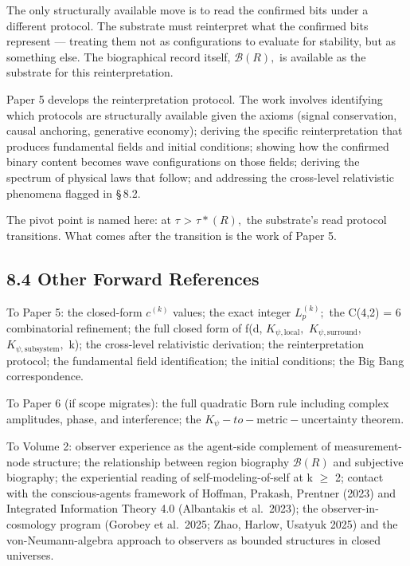 \documentclass[11pt,oneside]{report}
\theoremstyle{definition}
\theoremstyle{remark}
\begin{document}
The only structurally available move is to read the confirmed bits under
a different protocol. The substrate must reinterpret what the confirmed
bits represent --- treating them not as configurations to evaluate for
stability, but as something else. The biographical record itself, \ensuremath{\mathcal{B}(R),}
is available as the substrate for this reinterpretation.

Paper 5 develops the reinterpretation protocol. The work involves
identifying which protocols are structurally available given the axioms
(signal conservation, causal anchoring, generative economy); deriving
the specific reinterpretation that produces fundamental fields and
initial conditions; showing how the confirmed binary content becomes
wave configurations on those fields; deriving the spectrum of physical
laws that follow; and addressing the cross-level relativistic phenomena
flagged in \S\,8.2.

The pivot point is named here: at \ensuremath{\tau} \textgreater{} \ensuremath{\tau *(R),} the
substrate's read protocol transitions. What comes after the transition
is the work of Paper 5.

\subsection*{8.4 Other Forward References}

To Paper 5: the closed-form \ensuremath{c^{(k)}} values; the exact integer
\ensuremath{L_{p}^{(k)};} the C(4,2) = 6 combinatorial refinement; the full closed
form of f(d, \ensuremath{K_{\psi,\mathrm{local}},} \ensuremath{K_{\psi,\mathrm{surround}},} \ensuremath{K_{\psi,\mathrm{subsystem}},} k); the
cross-level relativistic derivation; the reinterpretation protocol; the
fundamental field identification; the initial conditions; the Big Bang
correspondence.

To Paper 6 (if scope migrates): the full quadratic Born rule including
complex amplitudes, phase, and interference; the
\ensuremath{K_{\psi}-to-\text{metric}-\text{uncertainty}} theorem.

To Volume 2: observer experience as the agent-side complement of
measurement-node structure; the relationship between region biography
\ensuremath{\mathcal{B}(R)} and subjective biography; the experiential reading of
self-modeling-of-self at k \ensuremath{\geq} 2; contact with the conscious-agents
framework of Hoffman, Prakash, Prentner (2023) and Integrated
Information Theory 4.0 (Albantakis et al.~2023); the
observer-in-cosmology program (Gorobey et al.~2025; Zhao, Harlow,
Usatyuk 2025) and the von-Neumann-algebra approach to observers as
bounded structures in closed universes.
\end{document}
